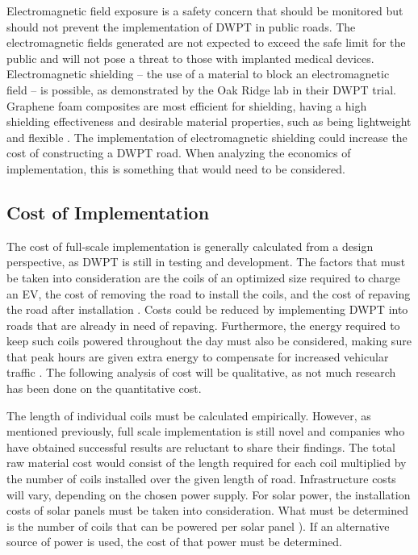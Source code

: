 Electromagnetic field exposure is a safety concern that should be monitored but should not prevent the implementation 
of DWPT in public roads. The electromagnetic fields generated are not expected to exceed the safe limit for the public 
and will not pose a threat to those with implanted medical devices. Electromagnetic shielding – the use of a material 
to block an electromagnetic field – is possible, as demonstrated by the Oak Ridge lab in their DWPT trial. Graphene 
foam composites are most efficient for shielding, having a high shielding effectiveness and desirable material 
properties, such as being lightweight and flexible \cite{chen_lightweight_2013}. The implementation of electromagnetic 
shielding could increase the cost of constructing a DWPT road. When analyzing the economics of implementation, 
this is something that would need to be considered.

\subsection{Cost of Implementation}
The cost of full-scale implementation is generally calculated from a design perspective, as DWPT is still in testing 
and development. The factors that must be taken into consideration are the coils of an optimized size required to 
charge an EV, the cost of removing the road to install the coils, and the cost of repaving the road after installation 
\cite{chen_lightweight_2013}. Costs could be reduced by implementing DWPT into roads that are already in need of repaving. 
Furthermore, the energy required to keep such coils powered throughout the day must also be considered, making sure 
that peak hours are given extra energy to compensate for increased vehicular traffic \cite{chen_lightweight_2013}. 
The following analysis of cost will be qualitative, as not much research has been done on the quantitative cost. 

The length of individual coils must be calculated empirically. However, as mentioned previously, full scale 
implementation is still novel and companies who have obtained successful results are reluctant to share their 
findings. The total raw material cost would consist of the length required for each coil multiplied by the number 
of coils installed over the given length of road. Infrastructure costs will vary, depending on the chosen power supply. 
For solar power, the installation costs of solar panels must be taken into consideration. What must be determined is 
the number of coils that can be powered per solar panel \cite{chen_lightweight_2013}). If an alternative source of power is used, 
the cost of that power must be determined. 

